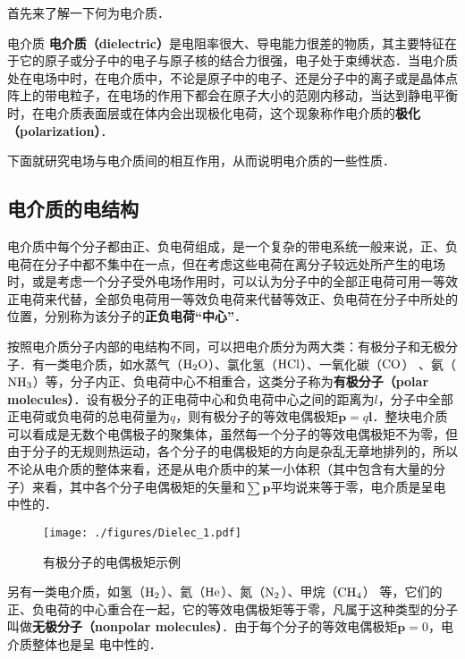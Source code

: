 
首先来了解一下何为电介质．
\begin{definition}{电介质}
\textbf{电介质（dielectric）}是电阻率很大、导电能力很差的物质，其主要特征在于它的原子或分子中的电子与原子核的结合力很强，电子处于束缚状态．当电介质处在电场中时，在电介质中，不论是原子中的电子、还是分子中的离子或是晶体点阵上的带电粒子，在电场的作用下都会在原子大小的范刚内移动，当达到静电平衡时，在电介质表面层或在体内会出现极化电荷，这个现象称作电介质的\textbf{极化（polarization）}．
\end{definition}
下面就研究电场与电介质间的相互作用，从而说明电介质的一些性质．

\subsection{电介质的电结构}

电介质中每个分子都由正、负电荷组成，是一个复杂的带电系统一般来说，正、负电荷在分子中都不集中在一点，但在考虑这些电荷在离分子较远处所产生的电场时，或是考虑一个分子受外电场作用时，可以认为分子中的全部正电荷可用一等效正电荷来代替，全部负电荷用一等效负电荷来代替等效正、负电荷在分子中所处的位置，分别称为该分子的\textbf{正负电荷“中心”}．

按照电介质分子内部的电结构不同，可以把电介质分为两大类：有极分子和无极分子．有一类电介质，如水蒸气（$\rm H_2O$）、氯化氢（$\rm HCl$）、一氧化碳（$\rm CO$） 、氨（$\rm NH_3$）等，分子内正、负电荷中心不相重合，这类分子称为\textbf{有极分子（polar molecules）}．设有极分子的正电荷中心和负电荷中心之间的距离为$l$，分子中全部正电荷或负电荷的总电荷量为$q$，则有极分子的等效电偶极矩$\mathbf p=q\mathbf l$．整块电介质可以看成是无数个电偶极子的聚集体，虽然每一个分子的等效电偶极矩不为零，但由于分子的无规则热运动，各个分子的电偶极矩的方向是杂乱无章地排列的，所以不论从电介质的整体来看，还是从电介质中的某一小体积（其中包含有大量的分子）来看，其中各个分子电偶极矩的矢量和$\sum \mathbf p$平均说来等于零，电介质是呈电中性的．
\begin{figure}[ht]
\centering
\texttt{[image: ./figures/Dielec\_1.pdf]}
\caption{有极分子的电偶极矩示例} \label{Dielec_fig1}
\end{figure}
另有一类电介质，如氢（$\rm H_2$）、氦（$\rm He$）、氮（$\rm N_2$）、甲烷（$\rm CH_4$） 等，它们的正、负电荷的中心重合在一起，它的等效电偶极矩等于零，凡属于这种类型的分子叫做\textbf{无极分子（nonpolar molecules）}．由于每个分子的等效电偶极矩$\mathbf p=0$，电介质整体也是呈
电中性的．

